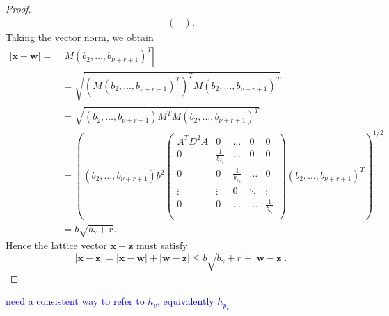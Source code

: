 \documentclass[11pt]{report}
\theoremstyle{definition}
\newcommand{\edit}[1]{\textcolor{blue}{#1}}
\begin{document}
\begin{proof}
\begin{align*}
\begin{pmatrix}
    \end{pmatrix}.
  \end{align*}
  Taking the vector norm, we obtain
  \begin{align*}
    |\mathbf{x} - \mathbf{w}| =
    & |M(b_2, \dots, b_{\nu+r+1})^T| \\
    & = \sqrt{(M(b_2, \dots, b_{\nu+r+1})^T)^TM(b_2, \dots, b_{\nu+r+1})^T}\\
    & = \sqrt{(b_2, \dots, b_{\nu+r+1})M^TM(b_2, \dots, b_{\nu+r+1})^T}\\
    & = \left((b_2, \dots, b_{\nu+r+1})b^2
      \begin{pmatrix}
        A^TD^2A & 0 & \dots & 0 & 0\\
        0 & \frac{1}{b_{\varepsilon_1}} & \dots & 0 & 0\\
        0 & 0  & \frac{1}{b_{\varepsilon_2}} & \dots & 0\\
        \vdots & \vdots &0 &  \ddots & \vdots\\
        0 & 0 & \dots & \dots & \frac{1}{b_{\varepsilon_r}}\\
      \end{pmatrix}(b_2, \dots, b_{\nu+r+1})^T \right)^{1/2}\\
    & = b\sqrt{b_{\gamma} + r}.
  \end{align*}
  Hence the lattice vector $\mathbf{x} - \mathbf{z}$ must satisfy
  \[|\mathbf{x} - \mathbf{z}| = |\mathbf{x} - \mathbf{w}| + |\mathbf{w} - \mathbf{z}|
    \leq b\sqrt{b_{\gamma}+r} + |\mathbf{w} - \mathbf{z}| .\]
\end{proof}

\edit{need a consistent way to refer to $h_v$, equivalently $h_{p_v}$}
\end{document}
